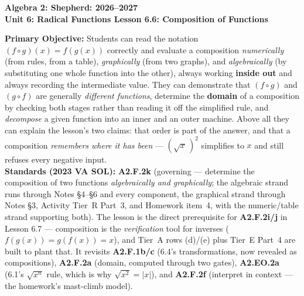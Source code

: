 \documentclass[10pt]{article}
\newcommand{\CourseName}{Algebra 2: Shepherd}
\newcommand{\SchoolYear}{2026--2027}
\newcommand{\UnitNumberName}{Unit 6: Radical Functions \quad}
\newcommand{\LessonNumberName}{Lesson 6.6: Composition of Functions}
\begin{document}
\begin{center}
    {\Large\bfseries \CourseName: \SchoolYear \\
    {\small\bfseries \UnitNumberName \LessonNumberName}}
\end{center}

\begin{tcolorbox}[colback=forestbg, colframe=forest, boxrule=0.9pt, arc=2mm,
    left=2mm, right=2mm, top=1.5mm, bottom=1.5mm]
    \textbf{Primary Objective:} Students can read the notation $(f\circ g)(x)=f(g(x))$ correctly and
    evaluate a composition \emph{numerically} (from rules, from a table), \emph{graphically} (from
    two graphs), and \emph{algebraically} (by substituting one whole function into the other),
    always working \textbf{inside out} and always recording the intermediate value. They can
    demonstrate that $(f\circ g)$ and $(g\circ f)$ are generally \emph{different functions},
    determine the \textbf{domain} of a composition by checking both stages rather than reading it
    off the simplified rule, and \emph{decompose} a given function into an inner and an outer
    machine. Above all they can explain the lesson's two claims: that order is part of the answer,
    and that a composition \emph{remembers where it has been} --- $\left(\sqrt{x}\,\right)^{2}$
    simplifies to $x$ and still refuses every negative input.
    \\[2pt]
    \textbf{Standards (2023 VA SOL):} \textbf{A2.F.2k} (governing --- determine the composition of
    two functions \emph{algebraically and graphically}; the algebraic strand runs through Notes
    \S4--\S6 and every component, the graphical strand through Notes \S3, Activity Tier~R Part~3, and
    Homework item~4, with the numeric/table strand supporting both). The lesson is the direct
    prerequisite for \textbf{A2.F.2i/j} in Lesson 6.7 --- composition is the \emph{verification} tool
    for inverses ($f(g(x))=g(f(x))=x$), and Tier~A rows (d)/(e) plus Tier~E Part~4 are built to plant
    that. It revisits \textbf{A2.F.1b/c} (6.4's transformations, now revealed as compositions),
    \textbf{A2.F.2a} (domain, computed through two gates), \textbf{A2.EO.2a} (6.1's
    $\sqrt{x^{n}}$ rule, which is why $\sqrt{x^{2}}=|x|$), and \textbf{A2.F.2f} (interpret in
    context --- the homework's mast-climb model).
\end{tcolorbox}
\end{document}
